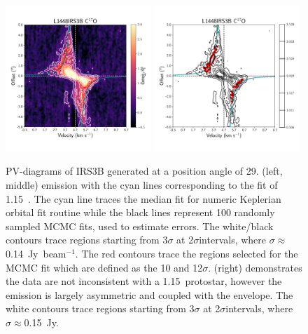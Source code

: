\begin{figure}[H]
\begin{center}
\includegraphics[width=0.49\textwidth]{img/irs3b_c17o_pv.pdf}
\includegraphics[width=0.49\textwidth]{img/PV-Diagram_L1448IRS3B_C17O_image_taper1500k_fit_xtr.pdf}
\end{center}
\caption{PV-diagrams of IRS3B generated at a position angle of 29\deg. \cso\space (left, middle) emission with the cyan lines corresponding to the fit of 1.15~\solm. The cyan line traces the median fit for numeric Keplerian orbital fit routine while the black lines represent 100 randomly sampled MCMC fits, used to estimate errors. The white/black contours trace regions starting from 3$\sigma$ at 2$\sigma$\space intervals, where $\sigma\approx$0.14~Jy~beam$^{-1}$. The red contours trace the regions selected for the MCMC fit which are defined as the 10 and 12$\sigma$. \htcop\space (right) demonstrates the data are not inconsistent with a 1.15~\solm\space protostar, however the emission is largely asymmetric and coupled with the envelope. The white contours trace regions starting from 3$\sigma$ at 2$\sigma$\space intervals, where $\sigma\approx$0.15~Jy.}\label{fig:l1448irs3b_c17o_pv}
\end{figure}




